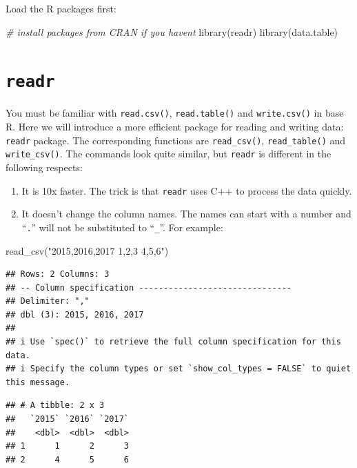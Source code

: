 \documentclass[
  12pt,
]{krantz}
\makeatletter
\newenvironment{Shaded}{\begin{snugshade}}{\end{snugshade}}
\newcommand{\CommentTok}[1]{\textcolor[rgb]{0.37,0.37,0.37}{\textit{#1}}}
\newcommand{\FunctionTok}[1]{\textcolor[rgb]{0,0,0}{#1}}
\newcommand{\NormalTok}[1]{#1}
\newcommand{\StringTok}[1]{\textcolor[rgb]{0.5,0.5,0.5}{#1}}
\newenvironment{kframe}{%
\medskip{}
\setlength{\fboxsep}{.8em}
 \def\at@end@of@kframe{}%
 \ifinner\ifhmode%
  \def\at@end@of@kframe{\end{minipage}}%
  \begin{minipage}{\columnwidth}%
 \fi\fi%
 \def\FrameCommand##1{\hskip\@totalleftmargin \hskip-\fboxsep
 \colorbox{shadecolor}{##1}\hskip-\fboxsep
     \hskip-\linewidth \hskip-\@totalleftmargin \hskip\columnwidth}%
 \MakeFramed {\advance\hsize-\width
   \@totalleftmargin\z@ \linewidth\hsize
   \@setminipage}}%
 {\par\unskip\endMakeFramed%
 \at@end@of@kframe}
\renewenvironment{Shaded}{\begin{kframe}}{\end{kframe}}
\makeatother
\begin{document}
Load the R packages first:

\begin{Shaded}
\begin{Highlighting}[]
\CommentTok{\# install packages from CRAN if you haven\textquotesingle{}t}
\FunctionTok{library}\NormalTok{(readr)}
\FunctionTok{library}\NormalTok{(data.table)}
\end{Highlighting}
\end{Shaded}

\hypertarget{readr}{%
\section{\texorpdfstring{\texttt{readr}}{readr}}\label{readr}}

You must be familiar with \texttt{read.csv()}, \texttt{read.table()} and \texttt{write.csv()} in base R. Here we will introduce a more efficient package for reading and writing data: \texttt{readr} package. The corresponding functions are \texttt{read\_csv()}, \texttt{read\_table()} and \texttt{write\_csv()}. The commands look quite similar, but \texttt{readr} is different in the following respects:

\begin{enumerate}
\def\labelenumi{\arabic{enumi}.}
\item
  It is 10x faster. The trick is that \texttt{readr} uses C++ to process the data quickly.
\item
  It doesn't change the column names. The names can start with a number and ``\texttt{.}'' will not be substituted to ``\texttt{\_}''. For example:
\end{enumerate}

\begin{Shaded}
\begin{Highlighting}[]
\FunctionTok{read\_csv}\NormalTok{(}\StringTok{"2015,2016,2017}
\StringTok{1,2,3}
\StringTok{4,5,6"}\NormalTok{)}
\end{Highlighting}
\end{Shaded}

\begin{verbatim}
## Rows: 2 Columns: 3
## -- Column specification -------------------------------
## Delimiter: ","
## dbl (3): 2015, 2016, 2017
## 
## i Use `spec()` to retrieve the full column specification for this data.
## i Specify the column types or set `show_col_types = FALSE` to quiet this message.
\end{verbatim}

\begin{verbatim}
## # A tibble: 2 x 3
##   `2015` `2016` `2017`
##    <dbl>  <dbl>  <dbl>
## 1      1      2      3
## 2      4      5      6
\end{verbatim}
\end{document}
